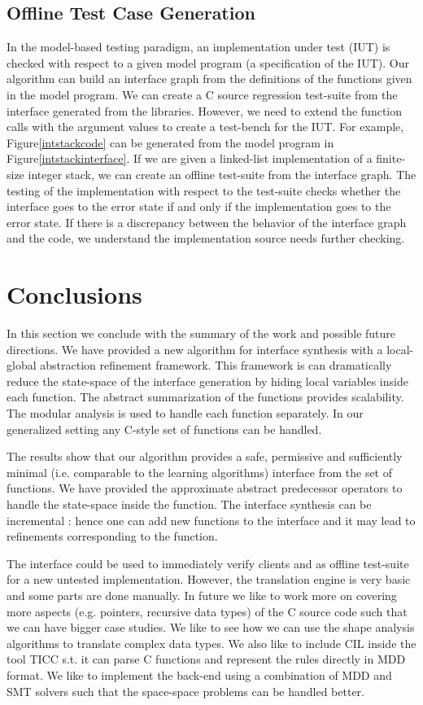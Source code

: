 \documentclass{llncs}
\begin{document}
\subsection{Offline Test Case Generation}
In the model-based testing paradigm, an implementation under test (IUT) is checked with respect to a given model program 
(a specification of the IUT).
Our algorithm can build an interface graph from the definitions of the functions given in the model program.
We can create a C source regression test-suite from the interface generated from the libraries. 
However, we need to extend the function calls with the argument values to create a test-bench for the IUT.
For example, Figure\ref{intstackcode} can be generated from the model program in Figure\ref{intstackinterface}. 
If we are given a linked-list  implementation of a finite-size integer stack,  we can create an offline test-suite 
from the interface graph.
The testing of the implementation with respect to the test-suite checks whether the interface goes to the error state if and only
if the implementation goes to the error state.
If there is a discrepancy between the behavior of the interface graph and the code, we understand the implementation source
needs further checking. 

 
\section{Conclusions}
In this section we conclude with the summary of the work and possible future directions.
We have provided a new algorithm for interface synthesis with a  local-global abstraction refinement 
framework.
This framework is can dramatically reduce the state-space of the interface generation by hiding
local variables inside each function.
The abstract summarization of the functions provides scalability. 
The modular analysis is used to handle each function separately.
In our generalized setting any C-style set of functions can be handled.
 

The results show that our algorithm provides a safe, permissive and sufficiently minimal (i.e. comparable to the learning algorithms) interface from the set of functions.
 We have provided the approximate abstract predecessor operators to handle the state-space inside
 the function.
 The interface synthesis can be incremental : hence one can add new functions to the interface 
 and it may lead to refinements corresponding to the function.
 
 
 The interface could be used to immediately verify clients and  as offline test-suite for a new untested  implementation.
 However, the translation engine is very basic and some parts are done manually.
In future we like to work more on covering more aspects (e.g. pointers, recursive data types) of the 
C source code such that we can have bigger case studies.
We like to see how we can use the shape analysis algorithms to translate complex data types.
We also like to include CIL inside the tool TICC s.t. it can parse C functions and represent the rules directly in MDD format.
We like to implement the back-end using a combination of MDD and SMT solvers such that the 
space-space problems can be handled better.
\end{document}
